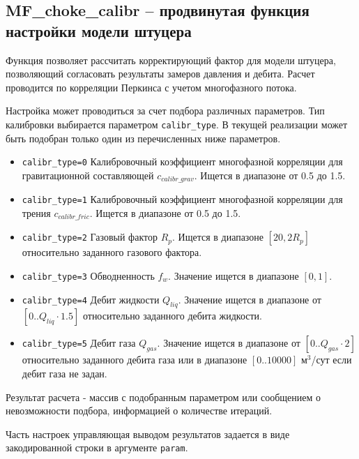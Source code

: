  

\subsection{MF\_choke\_calibr – продвинутая функция настройки модели штуцера}
Функция позволяет рассчитать корректирующий фактор для модели штуцера, позволяющий согласовать результаты замеров давления и дебита. Расчет проводится по корреляции Перкинса \cite{Perkins_1993} с учетом многофазного потока.  

Настройка может проводиться за счет подбора различных параметров. Тип калибровки выбирается параметром \texttt{calibr_type}. В текущей реализации может быть подобран только один из перечисленных ниже параметров.

\begin{itemize}
	\item \texttt{calibr_type=0} Калибровочный коэффициент многофазной корреляции для гравитационной составляющей  $c_{calibr\_grav}$. Ищется в диапазоне от 0.5 до 1.5.
	\item \texttt{calibr_type=1} Калибровочный коэффициент многофазной корреляции для трения $c_{calibr\_fric}$. Ищется в диапазоне от 0.5 до 1.5.
	\item \texttt{calibr_type=2} Газовый фактор $R_p$. Ищется в диапазоне $[20, 2 R_p]$ относительно заданного газового фактора. 
	\item \texttt{calibr_type=3} Обводненность $f_w$.  Значение ищется в диапазоне $[0, 1]$.  
	\item \texttt{calibr_type=4} Дебит жидкости \(Q_{liq}\). Значение ищется в диапазоне от \([0.. Q_{liq} \cdot 1.5]\) относительно заданного дебита жидкости. 	 
	\item \texttt{calibr_type=5} Дебит газа \(Q_{gas}\). Значение ищется  в диапазоне от \([0.. Q_{gas} \cdot 2]\) относительно заданного дебита газа или в диапазоне \([0..10000]\) м$^3$/сут если дебит газа не задан. 	
\end{itemize}

Результат расчета - массив с подобранным параметром или сообщением о невозможности подбора, информацией о количестве итераций. 


Часть настроек управляющая выводом результатов задается в виде закодированной строки в аргументе \texttt{param}.

